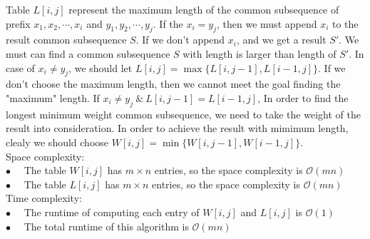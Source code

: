 \documentclass[12pt,letterpaper]{article}
\begin{document}
Table $L[i,j]$ represent the maximum length of the common subsequence of prefix $x_1,x_2,\cdots,x_i$ and $y_1,y_2,\cdots,y_j$. If the $x_i = y_j$, then we must append $x_i$ to the result common subsequence $S$. If we don't append $x_i$, and we get a result $S'$. We must can find a common subsequence $S$ with length is larger than length of $S'$. In case of $x_i \neq y_j$, we should let $L[i,j] = \max \{ L[i,j-1], L[i-1,j] \}$. If we don't choose the maximum length, then we cannot meet the goal finding the "maximum" length. If $x_i \neq y_j \ \&\  L[i,j-1] = L[i-1,j]$, In order to find the longest minimum weight common subsequence, we need to take the weight of the result into consideration. In order to achieve the result with mimimum length, clealy we should choose $W[i,j] = \min \{ W[i,j-1], W[i-1,j] \}$. \\
Space complexity: \\
$\bullet \quad$ The table $W[i,j]$ has $m \times n$ entries, so the space complexity is $\mathcal{O}(mn)$ \\
$\bullet \quad$ The table $L[i,j]$ has $m \times n$ entries, so the space complexity is $\mathcal{O}(mn)$ \\
Time complexity: \\
$\bullet \quad$ The runtime of computing each entry of $W[i,j]$ and $L[i,j]$ is $\mathcal{O}(1)$ \\
$\bullet \quad$ The total runtime of this algorithm is $\mathcal{O}(mn)$ \\
\end{document}
